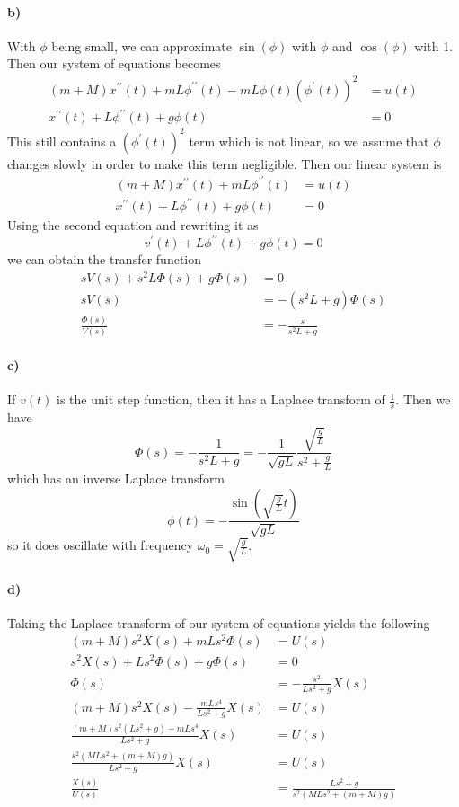 \documentclass[12pt]{article}
\begin{document}
\paragraph{b)}

With \(\phi\) being small, we can approximate \(\sin(\phi)\) with \(\phi\) and \(\cos(\phi)\) with 1. Then our system of equations
becomes
\begin{align*}
    (m+M)x^{\prime\prime}(t)+mL\phi^{\prime\prime}(t)-mL\phi(t)(\phi^\prime(t))^2&=u(t)\\
    x^{\prime\prime}(t)+L\phi^{\prime\prime}(t)+g\phi(t)&=0
\end{align*}
This still contains a \((\phi^\prime(t))^2\) term which is not linear, so we assume that \(\phi\) changes slowly in order to make this
term negligible. Then our linear system is
\begin{align*}
    (m+M)x^{\prime\prime}(t)+mL\phi^{\prime\prime}(t)&=u(t)\\
    x^{\prime\prime}(t)+L\phi^{\prime\prime}(t)+g\phi(t)&=0
\end{align*}
Using the second equation and rewriting it as
\[v^\prime(t)+L\phi^{\prime\prime}(t)+g\phi(t)=0\]
we can obtain the transfer function
\begin{align*}
    sV(s)+s^2L\Phi(s)+g\Phi(s)&=0\\
    sV(s)&=-(s^2L+g)\Phi(s)\\
    \frac{\Phi(s)}{V(s)}&=-\frac{s}{s^2L+g}
\end{align*}

\paragraph{c)}

If \(v(t)\) is the unit step function, then it has a Laplace transform of \(\frac{1}{s}\). Then we have
\[\Phi(s)=-\frac{1}{s^2L+g}=-\frac{1}{\sqrt{gL}}\frac{\sqrt{\frac{g}{L}}}{s^2+\frac{g}{L}}\]
which has an inverse Laplace transform
\[\phi(t)=-\frac{\sin\left(\sqrt{\frac{g}{L}}t\right)}{\sqrt{gL}}\]
so it does oscillate with frequency \(\omega_0=\sqrt{\frac{g}{L}}\).

\paragraph{d)}

Taking the Laplace transform of our system of equations yields the following
\begin{align*}
    (m+M)s^2X(s)+mLs^2\Phi(s)&=U(s)\\
    s^2X(s)+Ls^2\Phi(s)+g\Phi(s)&=0\\
    \Phi(s)&=-\frac{s^2}{Ls^2+g}X(s)\\
    (m+M)s^2X(s)-\frac{mLs^4}{Ls^2+g}X(s)&=U(s)\\
    \frac{(m+M)s^2(Ls^2+g)-mLs^4}{Ls^2+g}X(s)&=U(s)\\
    \frac{s^2(MLs^2+(m+M)g)}{Ls^2+g}X(s)&=U(s)\\
    \frac{X(s)}{U(s)}&=\frac{Ls^2+g}{s^2(MLs^2+(m+M)g)}
\end{align*}
\end{document}
